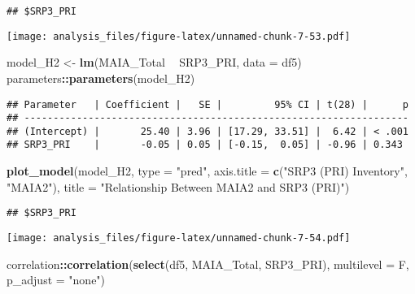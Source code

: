 \documentclass[
]{article}
\newenvironment{Shaded}{\begin{snugshade}}{\end{snugshade}}
\newcommand{\DataTypeTok}[1]{\textcolor[rgb]{0.13,0.29,0.53}{#1}}
\newcommand{\KeywordTok}[1]{\textcolor[rgb]{0.13,0.29,0.53}{\textbf{#1}}}
\newcommand{\NormalTok}[1]{#1}
\newcommand{\OperatorTok}[1]{\textcolor[rgb]{0.81,0.36,0.00}{\textbf{#1}}}
\newcommand{\StringTok}[1]{\textcolor[rgb]{0.31,0.60,0.02}{#1}}
\begin{document}
\begin{verbatim}
## $SRP3_PRI
\end{verbatim}

\texttt{[image: analysis\_files/figure-latex/unnamed-chunk-7-53.pdf]}

\begin{Shaded}
\begin{Highlighting}[]
\NormalTok{model_H2 <-}\StringTok{ }\KeywordTok{lm}\NormalTok{(MAIA_Total }\OperatorTok{~}\StringTok{  }\NormalTok{SRP3_PRI, }\DataTypeTok{data =}\NormalTok{ df5)}
\NormalTok{parameters}\OperatorTok{::}\KeywordTok{parameters}\NormalTok{(model_H2)}
\end{Highlighting}
\end{Shaded}

\begin{verbatim}
## Parameter   | Coefficient |   SE |         95% CI | t(28) |      p
## ------------------------------------------------------------------
## (Intercept) |       25.40 | 3.96 | [17.29, 33.51] |  6.42 | < .001
## SRP3_PRI    |       -0.05 | 0.05 | [-0.15,  0.05] | -0.96 | 0.343
\end{verbatim}

\begin{Shaded}
\begin{Highlighting}[]
\KeywordTok{plot_model}\NormalTok{(model_H2, }\DataTypeTok{type =} \StringTok{"pred"}\NormalTok{, }\DataTypeTok{axis.title =} \KeywordTok{c}\NormalTok{(}\StringTok{"SRP3 (PRI) Inventory"}\NormalTok{, }\StringTok{"MAIA2"}\NormalTok{), }\DataTypeTok{title =} \StringTok{"Relationship Between MAIA2 and SRP3 (PRI)"}\NormalTok{)}
\end{Highlighting}
\end{Shaded}

\begin{verbatim}
## $SRP3_PRI
\end{verbatim}

\texttt{[image: analysis\_files/figure-latex/unnamed-chunk-7-54.pdf]}

\begin{Shaded}
\begin{Highlighting}[]
\NormalTok{correlation}\OperatorTok{::}\KeywordTok{correlation}\NormalTok{(}\KeywordTok{select}\NormalTok{(df5,}
\NormalTok{         MAIA_Total,}
\NormalTok{         SRP3_PRI),}
  \DataTypeTok{multilevel =}\NormalTok{ F, }\DataTypeTok{p_adjust =} \StringTok{"none"}\NormalTok{)}
\end{Highlighting}
\end{Shaded}
\end{document}

